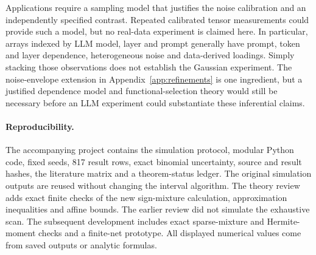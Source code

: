 \documentclass[11pt]{article}
\theoremstyle{remark}
\begin{document}
Applications require a sampling model that justifies the noise calibration and an independently specified contrast. Repeated calibrated tensor measurements could provide such a model, but no real-data experiment is claimed here. In particular, arrays indexed by LLM model, layer and prompt generally have prompt, token and layer dependence, heterogeneous noise and data-derived loadings. Simply stacking those observations does not establish the Gaussian experiment. The noise-envelope extension in Appendix~\ref{app:refinements} is one ingredient, but a justified dependence model and functional-selection theory would still be necessary before an LLM experiment could substantiate these inferential claims.

\paragraph{Reproducibility.}
The accompanying project contains the simulation protocol, modular Python code, fixed seeds, 817 result rows, exact binomial uncertainty, source and result hashes, the literature matrix and a theorem-status ledger. The original simulation outputs are reused without changing the interval algorithm. The theory review adds exact finite checks of the new sign-mixture calculation, approximation inequalities and affine bounds. The earlier review did not simulate the exhaustive scan. The subsequent development includes exact sparse-mixture and Hermite-moment checks and a finite-net prototype. All displayed numerical values come from saved outputs or analytic formulas.

\appendix







\end{document}
